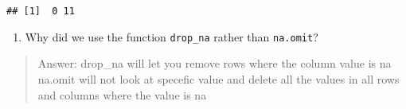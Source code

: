 \documentclass[
]{article}
\providecommand{\tightlist}{%
  \setlength{\itemsep}{0pt}\setlength{\parskip}{0pt}}
\begin{document}
\begin{verbatim}
## [1]  0 11
\end{verbatim}

\begin{enumerate}
\def\labelenumi{\arabic{enumi}.}
\setcounter{enumi}{13}
\tightlist
\item
  Why did we use the function \texttt{drop\_na} rather than
  \texttt{na.omit}?
\end{enumerate}

\begin{quote}
Answer: drop\_na will let you remove rows where the column value is na
na.omit will not look at specefic value and delete all the values in all
rows and columns where the value is na
\end{quote}
\end{document}
